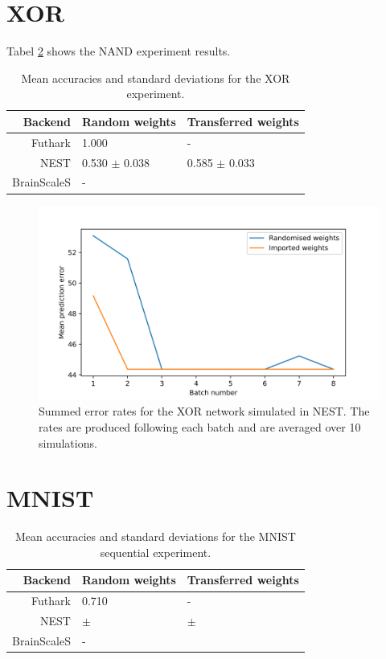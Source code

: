 \documentclass[report.tex]{subfiles}
\begin{document}
\section{XOR}

Tabel \ref{tab:nand} shows the NAND experiment results. 
\begin{table}
  \begin{tabular}{r l l}
  Backend & Random weights & Transferred weights \\ \hline
  Futhark & 1.000 & - \\ 
  NEST & 0.530 $\pm$ 0.038 & 0.585 $\pm$ 0.033 \\
  BrainScaleS & -
  \end{tabular}
  \caption{Mean accuracies and standard deviations for the XOR experiment.}
  \label{tab:nand}
\end{table}

\begin{figure}
  \includegraphics[width=\linewidth]{images/xor.png}
  \caption{Summed error rates for the XOR network simulated in NEST. The rates
  are produced following each batch and are averaged over 10 simulations.}
  \label{fig:xor_snn}
\end{figure}

\FloatBarrier

\section{MNIST}

\begin{table}
  \begin{tabular}{r l l}
  Backend & Random weights & Transferred weights \\ \hline
  Futhark & 0.710 & - \\ 
  NEST & $\pm$ & $\pm$ \\
  BrainScaleS & -
  \end{tabular}
  \caption{Mean accuracies and standard deviations for the MNIST sequential experiment.}
  \label{tab:nand}
\end{table}
\end{document}
